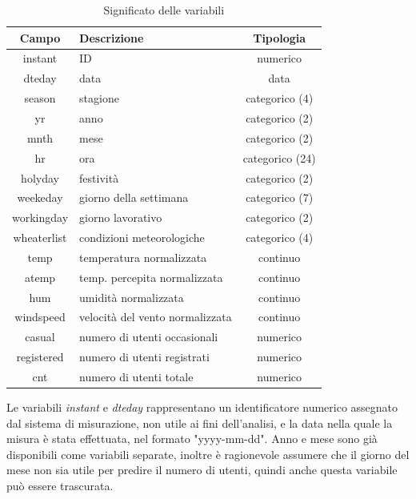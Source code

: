 \documentclass[a4paper, 10pt]{report}
\begin{document}
\begin{table}
  \centering
  \begin{tabular}{|| c | l | c ||}
    \hline
    Campo       & Descrizione                      & Tipologia       \\ \hline
    \hline
    instant     & ID                              & numerico        \\ \hline
    dteday      & data                            & data            \\ \hline
    season      & stagione                        & categorico (4)  \\ \hline
    yr          & anno                            & categorico (2)  \\ \hline
    mnth        & mese                            & categorico (2)  \\ \hline
    hr          & ora                             & categorico (24) \\ \hline
    holyday     & festività                       & categorico (2)  \\ \hline
    weekeday    & giorno della settimana          & categorico (7)  \\ \hline
    workingday  & giorno lavorativo               & categorico (2)  \\ \hline
    wheaterlist & condizioni meteorologiche       & categorico (4)  \\ \hline
    temp        & temperatura normalizzata        & continuo        \\ \hline
    atemp       & temp. percepita normalizzata    & continuo        \\ \hline
    hum         & umidità normalizzata            & continuo        \\ \hline
    windspeed   & velocità del vento normalizzata & continuo        \\ \hline
    casual      & numero di utenti occasionali    & numerico        \\ \hline
    registered  & numero di utenti registrati     & numerico        \\ \hline
    cnt         & numero di utenti totale         & numerico        \\ \hline
  \end{tabular}
  \caption{Significato delle variabili}
  \label{tab:variable-meaning}
\end{table}

Le variabili \emph{instant} e \emph{dteday} rappresentano un
identificatore numerico assegnato dal sistema di misurazione, non
utile ai fini dell'analisi, e la data nella quale la misura è stata effettuata,
nel formato "yyyy-mm-dd". Anno e mese sono già disponibili come variabili
separate, inoltre è ragionevole assumere che il giorno del mese non
sia utile per predire il numero di utenti, quindi anche questa variabile
può essere trascurata.
\end{document}
